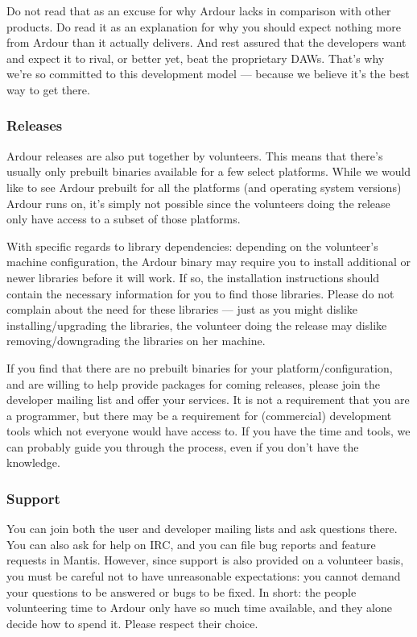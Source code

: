\documentclass[10pt,a4paper]{book}
\begin{document}
Do not read that as an excuse for why Ardour lacks in comparison with
other products. Do read it as an explanation for why you should expect
nothing more from Ardour than it actually delivers. And rest assured
that the developers want and expect it to rival, or better yet, beat
the proprietary DAWs. That's why we're so committed to this
development model --- because we believe it's the best way to get there.

\subsubsection{Releases}

Ardour releases are also put together by volunteers. This means that
there's usually only prebuilt binaries available for a few select
platforms. While we would like to see Ardour prebuilt for all the
platforms (and operating system versions) Ardour runs on, it's simply
not possible since the volunteers doing the release only have access
to a subset of those platforms.

With specific regards to library dependencies: depending on the
volunteer's machine configuration, the Ardour binary may require you
to install additional or newer libraries before it will work. If so,
the installation instructions should contain the necessary information
for you to find those libraries. Please do not complain about the need
for these libraries --- just as you might dislike installing/upgrading
the libraries, the volunteer doing the release may dislike
removing/downgrading the libraries on her machine.

If you find that there are no prebuilt binaries for your
platform/configuration, and are willing to help provide packages for
coming releases, please join the developer mailing list and offer your
services. It is not a requirement that you are a programmer, but there
may be a requirement for (commercial) development tools which not
everyone would have access to. If you have the time and tools, we can
probably guide you through the process, even if you don't have the
knowledge.

\subsubsection{Support}

You can join both the user and developer mailing lists and ask
questions there. You can also ask for help on IRC, and you can file
bug reports and feature requests in Mantis. However, since support is
also provided on a volunteer basis, you must be careful not to have
unreasonable expectations: you cannot demand your questions to be
answered or bugs to be fixed. In short: the people volunteering time
to Ardour only have so much time available, and they alone decide how
to spend it. Please respect their choice.
\end{document}

